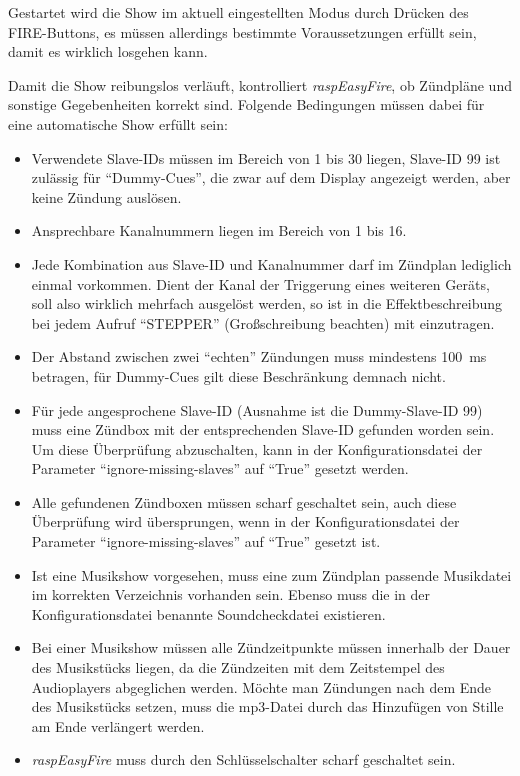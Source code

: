 \documentclass[paper=a4, parskip, numbers=noenddot, toc=listof, headsepline]{scrbook}
\newcommand{\REF}{\emph{raspEasyFire}}
\begin{document}
				Gestartet wird die Show im aktuell eingestellten Modus durch Drücken des FIRE-Buttons, es müssen allerdings bestimmte Voraussetzungen erfüllt sein, damit es wirklich losgehen kann.
				
				Damit die Show reibungslos verläuft, kontrolliert {\REF}, ob Zündpläne und sonstige Gegebenheiten korrekt sind. Folgende Bedingungen müssen dabei für eine automatische Show erfüllt sein:
				\begin{itemize}
					\item Verwendete Slave-IDs müssen im Bereich von 1 bis 30 liegen, Slave-ID 99 ist zulässig für \enquote{Dummy-Cues}, die zwar auf dem Display angezeigt werden, aber keine Zündung auslösen.
					\item Ansprechbare Kanalnummern liegen im Bereich von 1 bis 16.
					\item Jede Kombination aus Slave-ID und Kanalnummer darf im Zündplan lediglich einmal vorkommen. Dient der Kanal der Triggerung eines weiteren Geräts, soll also wirklich mehrfach ausgelöst werden, so ist in die Effektbeschreibung bei jedem Aufruf \enquote{STEPPER} (Großschreibung beachten) mit einzutragen.
					\item Der Abstand zwischen zwei \enquote{echten} Zündungen muss mindestens \SI{100}{\milli\second} betragen, für Dummy-Cues gilt diese Beschränkung demnach nicht.
					\item Für jede angesprochene Slave-ID (Ausnahme ist die Dummy-Slave-ID 99) muss eine Zündbox mit der entsprechenden Slave-ID gefunden worden sein. Um diese Überprüfung abzuschalten, kann in der Konfigurationsdatei der Parameter \enquote{ignore-missing-slaves} auf \enquote{True} gesetzt werden.
					\item Alle gefundenen Zündboxen müssen scharf geschaltet sein, auch diese Überprüfung wird übersprungen, wenn in der Konfigurationsdatei der Parameter \enquote{ignore-missing-slaves} auf \enquote{True} gesetzt ist.
					\item Ist eine Musikshow vorgesehen, muss eine zum Zündplan passende Musikdatei im korrekten Verzeichnis vorhanden sein. Ebenso muss die in der Konfigurationsdatei benannte Soundcheckdatei existieren.
					\item Bei einer Musikshow müssen alle Zündzeitpunkte müssen innerhalb der Dauer des Musikstücks liegen, da die Zündzeiten mit dem Zeitstempel des Audioplayers abgeglichen werden. Möchte man Zündungen nach dem Ende des Musikstücks setzen, muss die mp3-Datei durch das Hinzufügen von Stille am Ende verlängert werden.
					\item {\REF} muss durch den Schlüsselschalter scharf geschaltet sein.
				\end{itemize}
\end{document}
